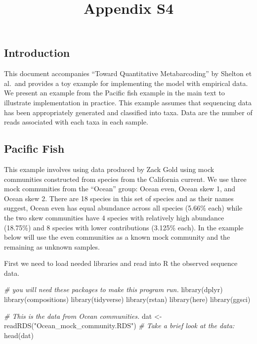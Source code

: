 \documentclass[
]{article}
\title{Appendix S4}
\author{}
\date{\vspace{-2.5em}}
\newenvironment{Shaded}{\begin{snugshade}}{\end{snugshade}}
\newcommand{\CommentTok}[1]{\textcolor[rgb]{0.56,0.35,0.01}{\textit{#1}}}
\newcommand{\FunctionTok}[1]{\textcolor[rgb]{0.00,0.00,0.00}{#1}}
\newcommand{\NormalTok}[1]{#1}
\newcommand{\OtherTok}[1]{\textcolor[rgb]{0.56,0.35,0.01}{#1}}
\newcommand{\StringTok}[1]{\textcolor[rgb]{0.31,0.60,0.02}{#1}}
\begin{document}
\maketitle

\hypertarget{introduction}{%
\subsection{Introduction}\label{introduction}}

This document accompanies ``Toward Quantitative Metabarcoding'' by
Shelton et al.~and provides a toy example for implementing the model
with empirical data. We present an example from the Pacific fish example
in the main text to illustrate implementation in practice. This example
assumes that sequencing data has been appropriately generated and
classified into taxa. Data are the number of reads associated with each
taxa in each sample.

\hypertarget{pacific-fish}{%
\subsection{Pacific Fish}\label{pacific-fish}}

This example involves using data produced by Zack Gold using mock
communities constructed from species from the California current. We use
three mock communities from the ``Ocean'' group: Ocean even, Ocean skew
1, and Ocean skew 2. There are 18 species in this set of species and as
their names suggest, Ocean even has equal abundance across all species
(5.66\% each) while the two skew communities have 4 species with
relatively high abundance (18.75\%) and 8 species with lower
contributions (3.125\% each). In the example below will use the even
communities as a known mock community and the remaining as unknown
samples.

First we need to load needed libraries and read into R the observed
sequence data.

\begin{Shaded}
\begin{Highlighting}[]
\CommentTok{\# you will need these packages to make this program run.}
\FunctionTok{library}\NormalTok{(dplyr)}
\FunctionTok{library}\NormalTok{(compositions)}
\FunctionTok{library}\NormalTok{(tidyverse)}
\FunctionTok{library}\NormalTok{(rstan)}
\FunctionTok{library}\NormalTok{(here)}
\FunctionTok{library}\NormalTok{(ggsci)}

\CommentTok{\# This is the data from Ocean communities.}
\NormalTok{dat }\OtherTok{\textless{}{-}} \FunctionTok{readRDS}\NormalTok{(}\StringTok{"Ocean\_mock\_community.RDS"}\NormalTok{)}
\CommentTok{\# Take a brief look at the data:}
\FunctionTok{head}\NormalTok{(dat)}
\end{Highlighting}
\end{Shaded}
\end{document}
